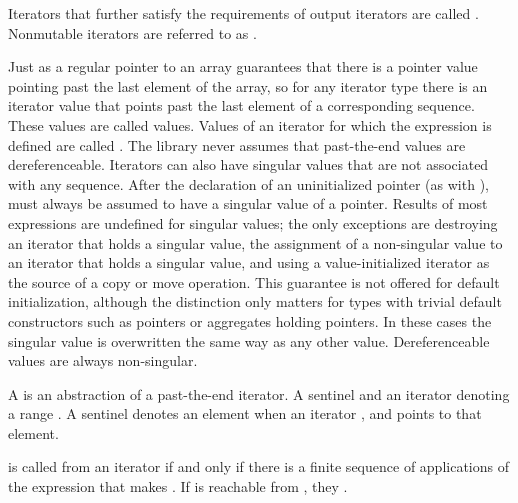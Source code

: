 \pnum
Iterators that further satisfy the requirements of output iterators are
called . Nonmutable iterators are referred to
as .

\pnum
Just as a regular pointer to an array guarantees that there is a pointer value pointing past the last element
of the array, so for any iterator type there is an iterator value that points past the last element of a
corresponding sequence.
These values are called
values.
Values of an iterator
for which the expression
is defined are called
.
The library never assumes that past-the-end values are dereferenceable.
Iterators can also have singular values that are not associated with any
sequence.
\enterexample
After the declaration of an uninitialized pointer
(as with
),
must always be assumed to have a singular value of a pointer.
\exitexample
Results of most expressions are undefined for singular values;
the only exceptions are destroying an iterator that holds a singular value,
the assignment of a non-singular value to
an iterator that holds a singular value, and using a value-initialized iterator
as the source of a copy or move operation. \enternote This guarantee is not
offered for default initialization, although the distinction only matters for types
with trivial default constructors such as pointers or aggregates holding pointers.
\exitnote
In these cases the singular
value is overwritten the same way as any other value.
Dereferenceable
values are always non-singular.

\begin{addedblock}
\pnum
A
is an abstraction of a past-the-end iterator.  A sentinel and an iterator denoting a range
.
A sentinel denotes an element when
an iterator , and
 points to that element. 
\end{addedblock}

\pnum
{}
is called
from an iterator
if and only if there is a finite sequence of applications of
the expression
that makes
.
If
is reachable from
,
they .

